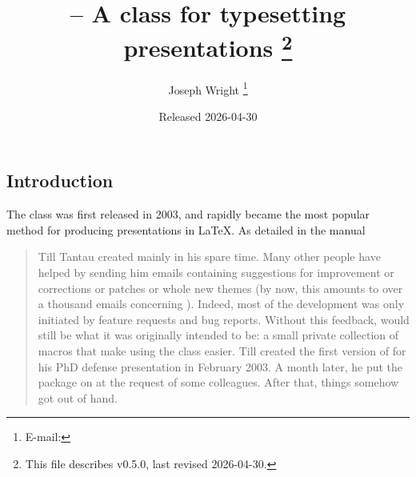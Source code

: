 \documentclass{l3doc}
\makeatletter
\let\acro\@firstofone
\def\filedate{2026-04-30}
\def\fileversion{v0.5.0}
\makeatother
\begin{document}
\title{%
   -- A class for typesetting presentations%
  \thanks{This file describes \fileversion,
    last revised \filedate.}%
}

\author{%
  Joseph Wright%
  \thanks{%
    E-mail: %
  }%
}

\date{Released \filedate}

\maketitle

\tableofcontents

\begin{documentation}

\section{Introduction%
  \label{sec:intro}}

The  class was first released in 2003, and rapidly became the
most popular method for producing presentations in \LaTeX{}. As detailed in
the  manual
\begin{quotation}
  Till Tantau created  mainly in his spare time. Many other people
  have helped by sending him emails containing suggestions for improvement or
  corrections or patches or whole new themes (by now, this amounts to over a
  thousand emails concerning ). Indeed, most of the development was
  only initiated by feature requests and bug reports. Without this feedback,
   would still be what it was originally intended to be: a small
  private collection of macros that make using the  class easier.
  Till created the first version of  for his PhD defense
  presentation in February 2003. A month later, he put the package on
  \acro{ctan} at the request of some colleagues. After that, things somehow got
  out of hand.
\end{quotation}


\end{documentation}
\end{document}
